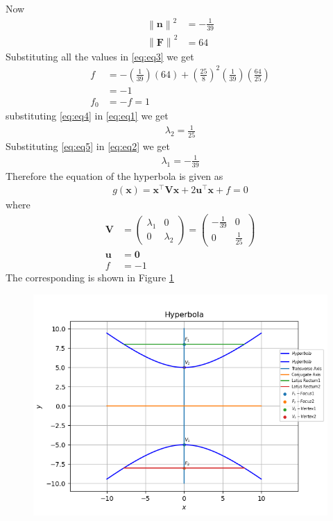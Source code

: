 \documentclass[12pt]{article}
\providecommand{\brak}[1]{\ensuremath{\left(#1\right)}}
\providecommand{\norm}[1]{\left\lVert#1\right\rVert}
\newcommand{\myvec}[1]{\ensuremath{\begin{pmatrix}#1\end{pmatrix}}}
\let\vec\mathbf
\begin{document}
Now
\begin{align}
	\norm{\vec{n}}^2 &= -\frac{1}{39}\\
	\norm{\vec{F}}^2 &= 64
\end{align}
Substituting all the values in \eqref{eq:eq3} we get
\begin{align}
	f &= -\brak{\frac{1}{39}}\brak{64} + \brak{\frac{25}{8}}^2 \brak{\frac{1}{39}} \brak{\frac{64}{25}}\\
	  &= -1\\
	\label{eq:eq4}  
	f_0  &= -f = 1
\end{align}
substituting \eqref{eq:eq4} in \eqref{eq:eq1} we get
\begin{align}
	\label{eq:eq5}
	\lambda_2 = \frac{1}{25} 
\end{align}
Substituting \eqref{eq:eq5} in \eqref{eq:eq2} we get
\begin{align}
	\lambda_1 = -\frac{1}{39}
\end{align}
Therefore the equation of the hyperbola is given as
\begin{align}
	g\brak{\vec{x}}=\vec{x}^\top \vec{V} \vec{x} + 2\vec{u}^\top \vec{x} + f = 0
\end{align}
where
\begin{align}
	\vec{V} &= \myvec{\lambda_1&0\\0&\lambda_2} = \myvec{-\frac{1}{39}&0\\0&\frac{1}{25}}\\
	\vec{u} &= \vec{0}\\
	f &= -1
\end{align}
The corresponding is shown in Figure \ref{fig:Fig1}
\begin{figure}[!h]
	\begin{center} 
	    \includegraphics[width=\columnwidth]{figs/hyperbola2}
	\end{center}
\caption{}
\label{fig:Fig1}
\end{figure}
\end{document}
